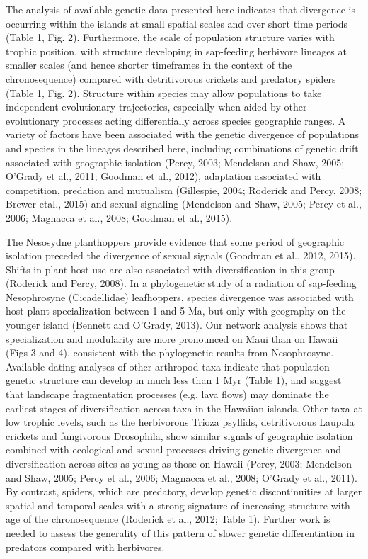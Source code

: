 The analysis of available genetic data presented here indicates that
divergence is occurring within the islands at small spatial scales and
over short time periods (Table 1, Fig. 2). Furthermore, the scale of
population structure varies with trophic position, with structure
developing in sap-feeding herbivore lineages at smaller scales (and
hence shorter timeframes in the context of the chronosequence)
compared with detritivorous crickets and predatory spiders (Table 1,
Fig. 2). Structure within species may allow populations to take
independent evolutionary trajectories, especially when aided by other
evolutionary processes acting differentially across species geographic
ranges. A variety of factors have been associated with the genetic
divergence of populations and species in the lineages described here,
including combinations of genetic drift associated with geographic
isolation (Percy, 2003; Mendelson and Shaw, 2005; O’Grady et al.,
2011; Goodman et al., 2012), adaptation associated with competition,
predation and mutualism (Gillespie, 2004; Roderick and Percy, 2008;
Brewer etal., 2015) and sexual signaling (Mendelson and Shaw, 2005;
Percy et al., 2006; Magnacca et al., 2008; Goodman et al., 2015).

The Nesosydne planthoppers provide evidence that some period of
geographic isolation preceded the divergence of sexual signals
(Goodman et al., 2012, 2015). Shifts in plant host use are also
associated with diversification in this group (Roderick and Percy,
2008). In a phylogenetic study of a radiation of sap-feeding
Nesophrosyne (Cicadellidae) leafhoppers, species divergence was
associated with host plant specialization between 1 and 5 Ma, but only
with geography on the younger island (Bennett and O’Grady, 2013). Our
network analysis shows that specialization and modularity are more
pronounced on Maui than on Hawaii (Figs 3 and 4), consistent with the
phylogenetic results from Nesophrosyne. Available dating analyses of
other arthropod taxa indicate that population genetic structure can
develop in much less than 1 Myr (Table 1), and suggest that landscape
fragmentation processes (e.g. lava flows) may dominate the earliest
stages of diversification across taxa in the Hawaiian islands. Other
taxa at low trophic levels, such as the herbivorous Trioza psyllids,
detritivorous Laupala crickets and fungivorous Drosophila, show
similar signals of geographic isolation combined with ecological and
sexual processes driving genetic divergence and diversification across
sites as young as those on Hawaii (Percy, 2003; Mendelson and Shaw,
2005; Percy et al., 2006; Magnacca et al., 2008; O’Grady et al.,
2011). By contrast, spiders, which are predatory, develop genetic
discontinuities at larger spatial and temporal scales with a strong
signature of increasing structure with age of the chronosequence
(Roderick et al., 2012; Table 1). Further work is needed to assess the
generality of this pattern of slower genetic differentiation in
predators compared with herbivores.


